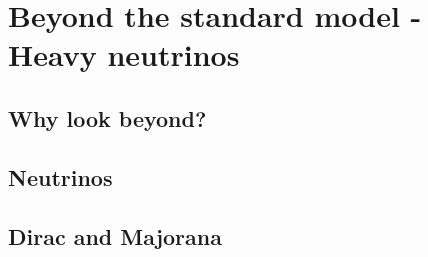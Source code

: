 \chapter{Beyond the standard model - Heavy neutrinos}
\section{Why look beyond?}
\section{Neutrinos}
\section{Dirac and Majorana}
